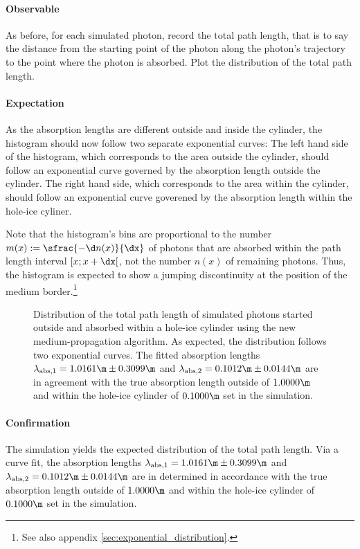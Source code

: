 \paragraph{Observable} As before, for each simulated photon, record the total path length, that is to say the distance from the starting point of the photon along the photon's trajectory to the point where the photon is absorbed. Plot the distribution of the total path length.

\paragraph{Expectation} As the absorption lengths are different outside and inside the cylinder, the histogram should now follow two separate exponential curves: The left hand side of the histogram, which corresponds to the area outside the cylinder, should follow an exponential curve governed by the absorption length outside the cylinder. The right hand side, which corresponds to the area within the cylinder, should follow an exponential curve goverened by the absorption length within the hole-ice cyliner.

Note that the histogram's bins are proportional to the number $m(x):=\sfrac{-\d n(x)}{\dx}$ of photons that are absorbed within the path length interval $[x; x+\dx[$, not the number $n(x)$ of remaining photons. Thus, the histogram is expected to show a jumping discontinuity at the position of the medium border.\footnote{See also appendix \ref{sec:exponential_distribution}.}

\begin{figure}
  \caption{Distribution of the total path length of simulated photons started outside and absorbed within a hole-ice cylinder using the new medium-propagation algorithm. As expected, the distribution follows two exponential curves. The fitted absorption lengths $\lambda_\text{abs,1} = 1.0161\m \pm 0.3099\m$ and $\lambda_\text{abs,2} = 0.1012\m \pm 0.0144\m$ are in agreement with the true absorption length outside of $1.0000\m$ and within the hole-ice cylinder of $0.1000\m$ set in the simulation.}
\end{figure}

\paragraph{Confirmation} The simulation yields the expected distribution of the total path length. Via a curve fit, the absorption lengths $\lambda_\text{abs,1} = 1.0161\m \pm 0.3099\m$ and $\lambda_\text{abs,2} = 0.1012\m \pm 0.0144\m$ are in determined in accordance with the true absorption length outside of $1.0000\m$ and within the hole-ice cylinder of $0.1000\m$ set in the simulation.

